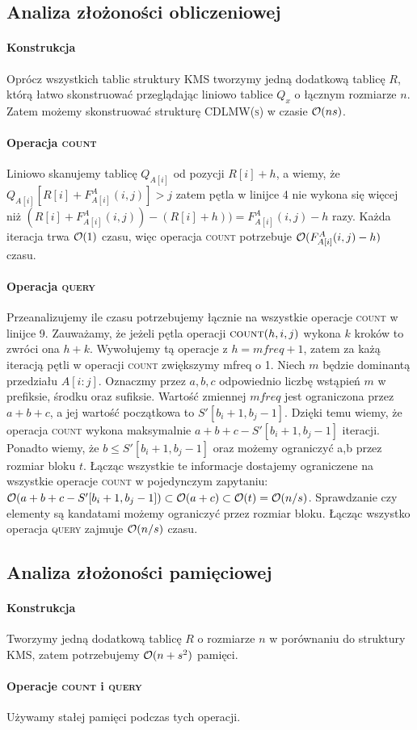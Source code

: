 \subsection{Analiza złożoności obliczeniowej}
\paragraph{Konstrukcja}
Oprócz wszystkich tablic struktury \textsc{KMS} tworzymy jedną dodatkową tablicę $R$, którą łatwo skonstruować przeglądając liniowo tablice $Q_x$ o łącznym rozmiarze $n$. Zatem możemy skonstruować strukturę  \textsc{CDLMW(s)} w czasie $\mathcal{O}(ns)$.
\paragraph{Operacja \textsc{count}}
Liniowo skanujemy tablicę $Q_{A[i]}$ od pozycji $R[i]+h$, a wiemy, że $Q_{A[i]}[R[i] + F^A_{A[i]}(i, j)] > j$ zatem pętla w linijce 4 nie wykona się więcej niż $(R[i] + F^A_{A[i]}(i, j)) - (R[i] + h)) = F^A_{A[i]}(i, j) - h$ razy. Każda iteracja trwa $\mathcal{O}(1)$ czasu, więc operacja \textsc{count} potrzebuje $\mathcal{O}(F^A_{A[i]}(i, j) - h)$ czasu.

\paragraph{Operacja \textsc{query}} Przeanalizujemy ile czasu potrzebujemy łącznie na wszystkie operacje \textsc{count} w linijce 9. Zauważamy, że jeżeli pętla operacji $\textsc{count}(h,i,j)$ wykona $k$ kroków to zwróci ona $h+k$. Wywołujemy tą operacje z $h=mfreq+1$, zatem za każą iteracją pętli w operacji \textsc{count} zwiększymy mfreq o 1. Niech $m$ będzie dominantą przedziału $A[i:j]$. Oznaczmy przez $a, b, c$ odpowiednio liczbę wstąpień $m$ w prefiksie, środku oraz sufiksie. Wartość zmiennej $mfreq$ jest ograniczona przez $a + b + c$, a jej wartość początkowa to $S'[b_i+1,b_j-1]$. Dzięki temu wiemy, że operacja \textsc{count} wykona maksymalnie $a+b+c - S'[b_i+1,b_j-1]$ iteracji.
Ponadto wiemy, że $b \le S'[b_i+1,b_j-1]$ oraz możemy ograniczyć a,b przez rozmiar bloku $t$. Łącząc wszystkie te informacje dostajemy ograniczene na wszystkie operacje \textsc{count} w pojedynczym zapytaniu: $\mathcal{O}(a+b+c-S'[b_i+1,b_j-1]) \subset \mathcal{O}(a+c) \subset \mathcal{O}(t) = \mathcal{O}(n/s)$. Sprawdzanie czy elementy są kandatami możemy ograniczyć przez rozmiar bloku. Łącząc wszystko operacja \textsc{query} zajmuje $\mathcal{O}(n/s)$ czasu.

\subsection{Analiza złożoności pamięciowej}
\paragraph{Konstrukcja} Tworzymy jedną dodatkową tablicę $R$ o rozmiarze $n$ w porównaniu do struktury \textsc{KMS}, zatem potrzebujemy $\mathcal{O}(n+s^2)$ pamięci.
\paragraph{Operacje \textsc{count} i \textsc{query}} Używamy stałej pamięci podczas tych operacji.
\newpage